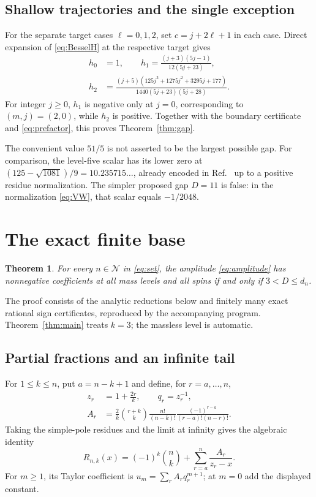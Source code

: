 \documentclass[11pt,a4paper]{article}
\newtheorem{theorem}{Theorem}[section]
\theoremstyle{remark}\newtheorem{remark}[theorem]{Remark}
\newcommand{\cset}{\mathcal N}
\begin{document}
\subsection{Shallow trajectories and the single exception}
For the separate target cases $\ell=0,1,2$, set $c=j+2\ell+1$ in each case. Direct expansion of \eqref{eq:BesselH} at the respective target gives
\begin{align}
 h_0&=1,\qquad
 h_1=\frac{(j+3)(5j-1)}{12(5j+23)},\\
 h_2&=\frac{(j+5)(125j^3+1275j^2+3295j+177)}
 {1440(5j+23)(5j+28)}.
\end{align}
For integer $j\geq0$, $h_1$ is negative only at $j=0$, corresponding to $(m,j)=(2,0)$, while $h_2$ is positive. Together with the boundary certificate and \eqref{eq:prefactor}, this proves Theorem~\ref{thm:gap}.

The convenient value $51/5$ is not asserted to be the largest possible gap. For comparison, the level-five scalar has its lower zero at $(125-\sqrt{1081})/9=10.235715\ldots$, already encoded in Ref.~\cite[Table 1]{AHHM} up to a positive residue normalization. The simpler proposed gap $D=11$ is false: in the normalization \eqref{eq:VW}, that scalar equals $-1/2048$.

\section{The exact finite base}\label{sec:base}
\begin{theorem}\label{thm:finite}
For every $n\in\cset$ in \eqref{eq:set}, the amplitude \eqref{eq:amplitude} has nonnegative coefficients at all mass levels and all spins if and only if $3<D\leq d_n$.
\end{theorem}
The proof consists of the analytic reductions below and finitely many exact rational sign certificates, reproduced by the accompanying program. Theorem~\ref{thm:main} treats $k=3$; the massless level is automatic.

\subsection{Partial fractions and an infinite tail}
For $1\leq k\leq n$, put $a=n-k+1$ and define, for $r=a,\ldots,n$,
\begin{align}
 z_r&=1+\frac{2r}{k},\qquad q_r=z_r^{-1},\\
 A_r&=\frac2k\binom{r+k}{k}\frac{n!}{(n-k)!}
       \frac{(-1)^{r-a}}{(r-a)!(n-r)!}.
\end{align}
Taking the simple-pole residues and the limit at infinity gives the algebraic identity
\begin{equation}\label{eq:pf}
 R_{n,k}(x)=(-1)^k\binom nk+\sum_{r=a}^{n}\frac{A_r}{z_r-x}.
\end{equation}
For $m\geq1$, its Taylor coefficient is $u_m=\sum_r A_r q_r^{m+1}$; at $m=0$ add the displayed constant.
\end{document}
